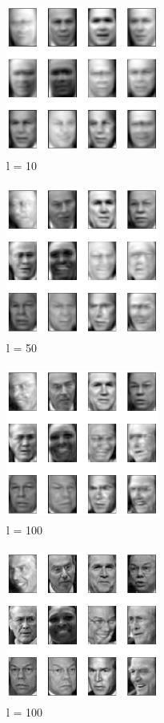 \documentclass[10pt]{article}
\begin{document}
\begin{figure}[H]
  \centering
  \includegraphics[width=5cm, height=5cm]{images/4.1c_2.png}
  \caption{l = 10}
  \label{fig:faces}
\end{figure}

\begin{figure}[H]
  \centering
  \includegraphics[width=5cm, height=5cm]{images/4.1c_3.png}
  \caption{l = 50}
  \label{fig:faces}
\end{figure}

\begin{figure}[H]
  \centering
  \includegraphics[width=5cm, height=5cm]{images/4.1c_4.png}
  \caption{l = 100}
  \label{fig:faces}
\end{figure}

\begin{figure}[H]
  \centering
  \includegraphics[width=5cm, height=5cm]{images/4.1c_5.png}
  \caption{l = 100}
  \label{fig:faces}
\end{figure}
\end{document}
